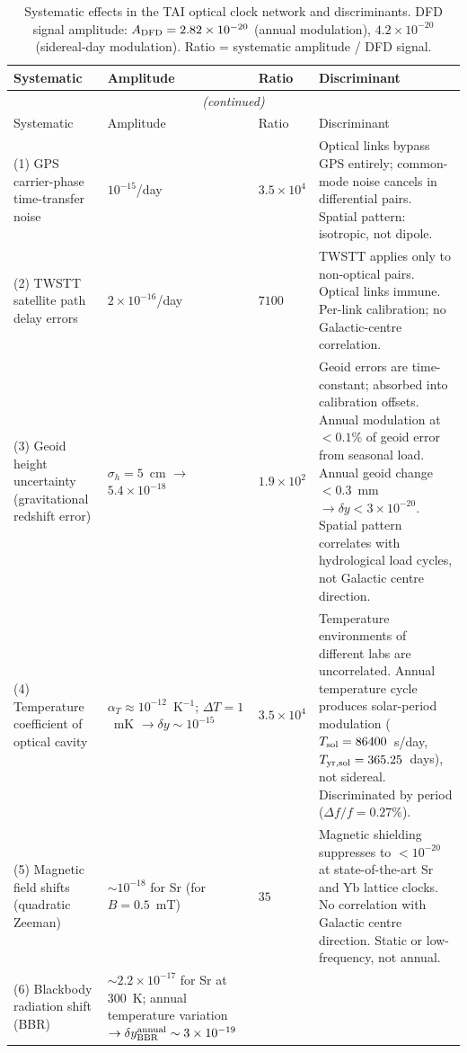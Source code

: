 \documentclass[aps,prd,twocolumn,superscriptaddress,nofootinbib]{revtex4-2}
\begin{document}
\begin{longtable}{p{3.2cm}p{2.2cm}p{1.8cm}p{3.5cm}}
\caption{Systematic effects in the TAI optical clock network and discriminants.
DFD signal amplitude: $A_{\rm DFD} = 2.82\times10^{-20}$ (annual modulation),
$4.2\times10^{-20}$ (sidereal-day modulation).
Ratio = systematic amplitude / DFD signal.}
\label{tab:systematics} \\
\toprule
Systematic & Amplitude & Ratio & Discriminant \\
\midrule
\endfirsthead
\multicolumn{4}{c}{\textit{(continued)}} \\
\toprule
Systematic & Amplitude & Ratio & Discriminant \\
\midrule
\endhead
\bottomrule
\endfoot
(1) GPS carrier-phase time-transfer noise &
$10^{-15}$/day &
$3.5\times10^4$ &
Optical links bypass GPS entirely; common-mode noise cancels in differential pairs. Spatial pattern: isotropic, not dipole. \\
\addlinespace
(2) TWSTT satellite path delay errors &
$2\times10^{-16}$/day &
$7100$ &
TWSTT applies only to non-optical pairs. Optical links immune. Per-link calibration; no Galactic-centre correlation. \\
\addlinespace
(3) Geoid height uncertainty (gravitational redshift error) &
$\sigma_h = 5$~cm $\to$ $5.4\times10^{-18}$ &
$1.9\times10^2$ &
Geoid errors are time-constant; absorbed into calibration offsets. Annual modulation at $<0.1\%$ of geoid error from seasonal load. Annual geoid change $<0.3$~mm $\to \delta y < 3\times10^{-20}$. Spatial pattern correlates with hydrological load cycles, not Galactic centre direction. \\
\addlinespace
(4) Temperature coefficient of optical cavity &
$\alpha_T \approx 10^{-12}$~K$^{-1}$; $\Delta T = 1$~mK $\to \delta y \sim 10^{-15}$ &
$3.5\times10^4$ &
Temperature environments of different labs are uncorrelated. Annual temperature cycle produces solar-period modulation ($T_{\rm sol} = 86400$~s/day, $T_{\rm yr,sol} = 365.25$~days), not sidereal. Discriminated by period ($\Delta f/f = 0.27\%$). \\
\addlinespace
(5) Magnetic field shifts (quadratic Zeeman) &
$\sim 10^{-18}$ for Sr (for $B = 0.5$~mT) &
$35$ &
Magnetic shielding suppresses to $<10^{-20}$ at state-of-the-art Sr and Yb lattice clocks. No correlation with Galactic centre direction. Static or low-frequency, not annual. \\
\addlinespace
(6) Blackbody radiation shift (BBR) &
$\sim 2.2\times10^{-17}$ for Sr at 300~K; annual temperature variation $\to \delta y_{\rm BBR}^{\rm annual} \sim 3\times10^{-19}$ &

\end{longtable}
\end{document}
